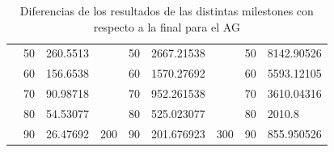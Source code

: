 \begin{table}[]
\begin{tabular}{|cclcclccl|}
\rowcolor[HTML]{DAE8FC} 
\multicolumn{1}{|c|}{\cellcolor[HTML]{FFFFC7}}                       & \multicolumn{1}{c|}{\cellcolor[HTML]{DAE8FC}50}        & \multicolumn{1}{l|}{\cellcolor[HTML]{DAE8FC}260.5513}   & \multicolumn{1}{c|}{\cellcolor[HTML]{FFFFC7}}                       & \multicolumn{1}{c|}{\cellcolor[HTML]{DAE8FC}50}        & \multicolumn{1}{l|}{\cellcolor[HTML]{DAE8FC}2667.21538} & \multicolumn{1}{c|}{\cellcolor[HTML]{FFFFC7}}                       & \multicolumn{1}{c|}{\cellcolor[HTML]{DAE8FC}50}        & 8142.90526 \\ \cline{2-3} \cline{5-6} \cline{8-9} 
\rowcolor[HTML]{DDFDFF} 
\multicolumn{1}{|c|}{\cellcolor[HTML]{FFFFC7}}                       & \multicolumn{1}{c|}{\cellcolor[HTML]{DDFDFF}60}        & \multicolumn{1}{l|}{\cellcolor[HTML]{DDFDFF}156.6538}   & \multicolumn{1}{c|}{\cellcolor[HTML]{FFFFC7}}                       & \multicolumn{1}{c|}{\cellcolor[HTML]{DDFDFF}60}        & \multicolumn{1}{l|}{\cellcolor[HTML]{DDFDFF}1570.27692} & \multicolumn{1}{c|}{\cellcolor[HTML]{FFFFC7}}                       & \multicolumn{1}{c|}{\cellcolor[HTML]{DDFDFF}60}        & 5593.12105 \\ \cline{2-3} \cline{5-6} \cline{8-9} 
\rowcolor[HTML]{DAE8FC} 
\multicolumn{1}{|c|}{\cellcolor[HTML]{FFFFC7}}                       & \multicolumn{1}{c|}{\cellcolor[HTML]{DAE8FC}70}        & \multicolumn{1}{l|}{\cellcolor[HTML]{DAE8FC}90.98718}   & \multicolumn{1}{c|}{\cellcolor[HTML]{FFFFC7}}                       & \multicolumn{1}{c|}{\cellcolor[HTML]{DAE8FC}70}        & \multicolumn{1}{l|}{\cellcolor[HTML]{DAE8FC}952.261538} & \multicolumn{1}{c|}{\cellcolor[HTML]{FFFFC7}}                       & \multicolumn{1}{c|}{\cellcolor[HTML]{DAE8FC}70}        & 3610.04316 \\ \cline{2-3} \cline{5-6} \cline{8-9} 
\rowcolor[HTML]{DDFDFF} 
\multicolumn{1}{|c|}{\cellcolor[HTML]{FFFFC7}}                       & \multicolumn{1}{c|}{\cellcolor[HTML]{DDFDFF}80}        & \multicolumn{1}{l|}{\cellcolor[HTML]{DDFDFF}54.53077}   & \multicolumn{1}{c|}{\cellcolor[HTML]{FFFFC7}}                       & \multicolumn{1}{c|}{\cellcolor[HTML]{DDFDFF}80}        & \multicolumn{1}{l|}{\cellcolor[HTML]{DDFDFF}525.023077} & \multicolumn{1}{c|}{\cellcolor[HTML]{FFFFC7}}                       & \multicolumn{1}{c|}{\cellcolor[HTML]{DDFDFF}80}        & 2010.8     \\ \cline{2-3} \cline{5-6} \cline{8-9} 
\rowcolor[HTML]{DAE8FC} 
\multicolumn{1}{|c|}{\multirow{-13}{*}{\cellcolor[HTML]{FFFFC7}100}} & \multicolumn{1}{c|}{\cellcolor[HTML]{DAE8FC}90}        & \multicolumn{1}{l|}{\cellcolor[HTML]{DAE8FC}26.47692}   & \multicolumn{1}{c|}{\multirow{-13}{*}{\cellcolor[HTML]{FFFFC7}200}} & \multicolumn{1}{c|}{\cellcolor[HTML]{DAE8FC}90}        & \multicolumn{1}{l|}{\cellcolor[HTML]{DAE8FC}201.676923} & \multicolumn{1}{c|}{\multirow{-13}{*}{\cellcolor[HTML]{FFFFC7}300}} & \multicolumn{1}{c|}{\cellcolor[HTML]{DAE8FC}90}        & 855.950526 \\ \hline
\end{tabular}
\caption{\label{diferenciasAGEU}Diferencias de los resultados de las distintas milestones con respecto a la final para el AG}
\end{table}

